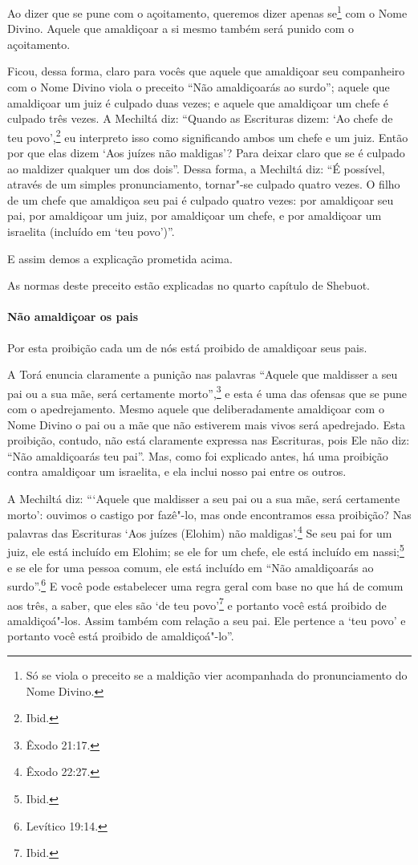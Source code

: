 \begin{multicols}{2}
Ao dizer que se pune com o açoitamento, queremos dizer apenas se\footnote{Só se viola o preceito se a maldição vier acompanhada do
pronunciamento do Nome Divino.} com o Nome Divino. Aquele que amaldiçoar a si
mesmo também será punido com o açoitamento.

Ficou, dessa forma, claro para vocês que aquele que amaldiçoar seu
companheiro com o Nome Divino viola o preceito ``Não amaldiçoarás ao
surdo''; aquele que amaldiçoar um juiz é culpado duas vezes; e aquele
que amaldiçoar um chefe é culpado três vezes. A Mechiltá\starr{} diz: ``Quando
as Escrituras dizem: `Ao chefe de teu povo',\footnote{Ibid.} eu interpreto isso
como significando ambos um chefe e um juiz. Então por que elas dizem
`Aos juízes não maldigas'? Para deixar claro que se é culpado ao
maldizer qualquer um dos dois''. Dessa forma, a Mechiltá\starr{} diz: ``É
possível, através de um simples pronunciamento, tornar"-se culpado
quatro vezes. O filho de um chefe que amaldiçoa seu pai é culpado quatro
vezes: por amaldiçoar seu pai, por amaldiçoar um juiz, por amaldiçoar um
chefe, e por amaldiçoar um israelita (incluído em `teu povo')''.

E assim demos a explicação prometida acima.

As normas deste preceito estão explicadas no quarto capítulo de Shebuot\starr.

\paragraph{Não amaldiçoar os pais}

Por esta proibição cada um de nós está proibido de amaldiçoar seus pais.

A Torá\starr{} enuncia claramente a punição nas palavras ``Aquele que maldisser
a seu pai ou a sua mãe, será certamente morto'',\footnote{Êxodo 21:17.} e esta é
uma das ofensas que se pune com o apedrejamento. Mesmo aquele que
deliberadamente amaldiçoar com o Nome Divino o pai ou a mãe que não
estiverem mais vivos será apedrejado. Esta proibição, contudo, não está
claramente expressa nas Escrituras, pois Ele não diz: ``Não amaldiçoarás
teu pai''. Mas, como foi explicado antes, há uma proibição contra
amaldiçoar um israelita, e ela inclui nosso pai entre os outros.

A Mechiltá\starr{} diz: ```Aquele que maldisser a seu pai ou a sua mãe, será
certamente morto': ouvimos o castigo por fazê"-lo, mas onde encontramos
essa proibição? Nas palavras das Escrituras `Aos juízes (Elohim\starr) não
maldigas'.\footnote{Êxodo 22:27.} Se seu pai for um juiz, ele está incluído em
Elohim\starr; se ele for um chefe, ele está incluído em
nassi\starr;\footnote{Ibid.} e se ele for uma pessoa comum, ele está incluído em
``Não amaldiçoarás ao surdo''.\footnote{Levítico 19:14.} E você pode estabelecer
uma regra geral com base no que há de comum aos três, a saber, que eles
são `de teu povo'\footnote{Ibid.} e portanto você está proibido de
amaldiçoá"-los. Assim também com relação a seu pai. Ele pertence a `teu
povo' e portanto você está proibido de amaldiçoá"-lo''.


\end{multicols}
